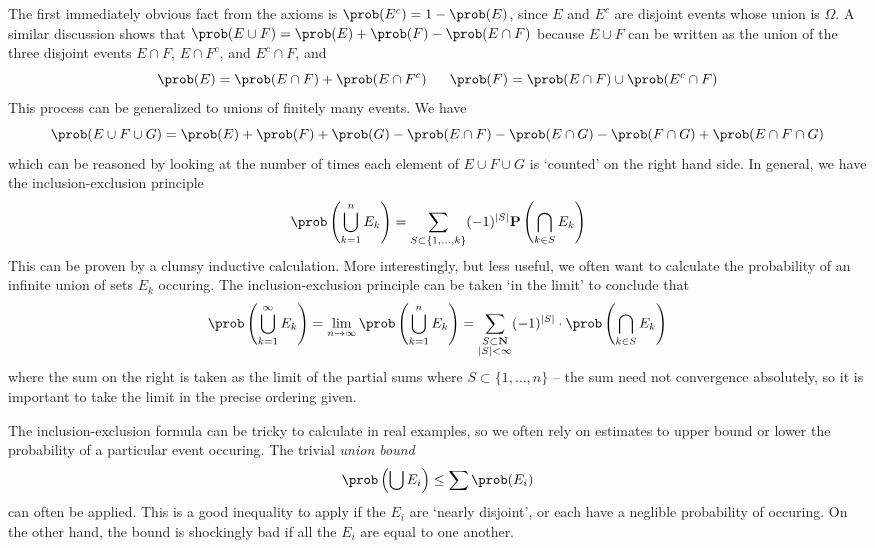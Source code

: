 The first immediately obvious fact from the axioms is $\prob(E^c) = 1 - \prob(E)$, since $E$ and $E^c$ are disjoint events whose union is $\Omega$. A similar discussion shows that $\prob(E \cup F) = \prob(E) + \prob(F) - \prob(E \cap F)$ because $E \cup F$ can be written as the union of the three disjoint events $E \cap F$, $E \cap F^c$, and $E^c \cap F$, and
%
\[ \prob(E) = \prob(E \cap F) + \prob(E \cap F^c)\ \ \ \ \ \prob(F) = \prob(E \cap F) \cup \prob(E^c \cap F) \]
%
This process can be generalized to unions of finitely many events. We have
%
\[ \prob(E \cup F \cup G) = \prob(E) + \prob(F) + \prob(G) - \prob(E \cap F) - \prob(E \cap G) - \prob(F \cap G) + \prob(E \cap F \cap G) \]
%
which can be reasoned by looking at the number of times each element of $E \cup F \cup G$ is `counted' on the right hand side. In general, we have the inclusion-exclusion principle
%
\[ \prob \left( \bigcup_{k = 1}^n E_k \right) = \sum_{S \subset \{ 1, \dots, k \}} (-1)^{|S|} \mathbf{P} \left( \bigcap_{k \in S} E_k \right) \]
%
This can be proven by a clumsy inductive calculation. More interestingly, but less useful, we often want to calculate the probability of an infinite union of sets $E_k$ occuring. The inclusion-exclusion principle can be taken `in the limit' to conclude that
%
\[ \prob \left(\bigcup_{k = 1}^\infty E_k \right) = \lim_{n \to \infty} \prob \left( \bigcup_{k = 1}^n E_k \right) = \sum_{\substack{S \subset \mathbf{N}\\|S| < \infty}} (-1)^{|S|} \cdot \prob \left( \bigcap_{k \in S} E_k \right) \]
%
where the sum on the right is taken as the limit of the partial sums where $S \subset \{ 1, \dots, n \}$ -- the sum need not convergence absolutely, so it is important to take the limit in the precise ordering given.

The inclusion-exclusion formula can be tricky to calculate in real examples, so we often rely on estimates to upper bound or lower the probability of a particular event occuring. The trivial \emph{union bound}
%
\[ \prob \left( \bigcup E_i \right) \leq \sum \prob(E_i) \]
%
can often be applied. This is a good inequality to apply if the $E_i$ are `nearly disjoint', or each have a neglible probability of occuring. On the other hand, the bound is shockingly bad if all the $E_i$ are equal to one another.

